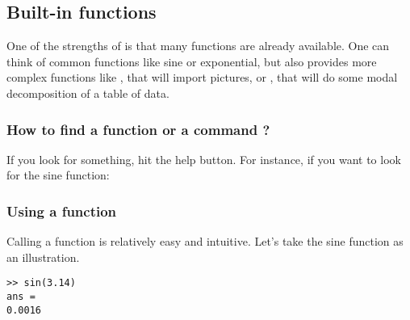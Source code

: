 	\subsection{Built-in functions}
		One of the strengths of \matlab is that many functions are already available.
		One can think of common functions like sine or exponential, but \matlab also provides more complex functions like , that will import pictures, or , that will do some modal decomposition of a table of data.

		\subsubsection{How to find a function or a command ?}
			If you look for something, hit the help button.
			For instance, if you want to look for the sine function:
	
		\subsubsection{Using a function}
			Calling a function is relatively easy and intuitive. Let's take the sine function as an illustration. 
\begin{lstlisting}
>> sin(3.14)
ans =
0.0016
\end{lstlisting}

